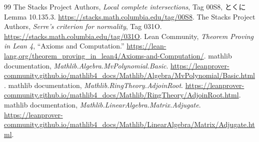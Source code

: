 \documentclass[11pt,a4paper]{ltjsarticle}
\numberwithin{equation}{section}
\theoremstyle{definition}
\begin{document}
\begin{thebibliography}{99}
The Stacks Project Authors,
\emph{Local complete intersections}, Tag 00S8, とくに Lemma 10.135.3.
\url{https://stacks.math.columbia.edu/tag/00S8}.
The Stacks Project Authors,
\emph{Serre's criterion for normality}, Tag 031O.
\url{https://stacks.math.columbia.edu/tag/031O}.
Lean Community,
\emph{Theorem Proving in Lean 4}, ``Axioms and Computation.''
\url{https://lean-lang.org/theorem_proving_in_lean4/Axioms-and-Computation/}.
mathlib documentation,
\emph{Mathlib.Algebra.MvPolynomial.Basic}.
\url{https://leanprover-community.github.io/mathlib4_docs/Mathlib/Algebra/MvPolynomial/Basic.html}.
mathlib documentation,
\emph{Mathlib.RingTheory.AdjoinRoot}.
\url{https://leanprover-community.github.io/mathlib4_docs/Mathlib/RingTheory/AdjoinRoot.html}.
mathlib documentation,
\emph{Mathlib.LinearAlgebra.Matrix.Adjugate}.
\url{https://leanprover-community.github.io/mathlib4_docs/Mathlib/LinearAlgebra/Matrix/Adjugate.html}.
\end{thebibliography}
\end{document}
